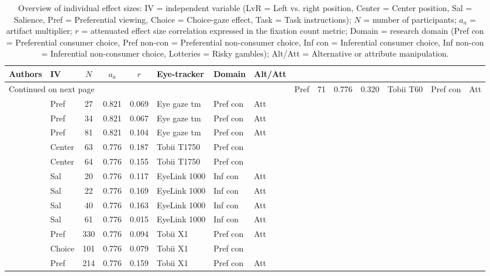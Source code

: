\begingroup\footnotesize
\begin{longtable}{p{5cm}lccclll}
\caption{Overview of individual effect sizes: IV = independent variable (LvR = Left vs. right position, Center = Center position, Sal = Salience, Pref = Preferential viewing, Choice = Choice-gaze effect, Task = Task instructions); $N$ = number of participants; $a_a$ = artifact multiplier; $r$ = attenuated effect size correlation expressed in the fixation count metric; Domain = research domain (Pref con = Preferential consumer choice, Pref non-con = Preferential non-consumer choice, Inf con = Inferential consumer choice, Inf non-con = Inferential non-consumer choice, Lotteries = Risky gambles); Alt/Att = Alternative or attribute manipulation.} \\ 
  \hline
Authors & IV & $N$ & $a_a$ & $r$ & Eye-tracker & Domain & Alt/Att \\ 
  \hline
\endhead
\hline
\multicolumn{8}{l}{\footnotesize Continued on next page}
\endfoot
\endlastfoot
 \hline
\cite{ares2014} & Pref & 71 & 0.776 & 0.320 & Tobii T60 & Pref con & Att \\ 
  \cite{ashby2015} & Pref & 27 & 0.821 & 0.069 & Eye gaze tm & Pref con & Att \\ 
  \cite{ashby2015} & Pref & 34 & 0.821 & 0.067 & Eye gaze tm & Pref con & Att \\ 
  \cite{ashby2015} & Pref & 81 & 0.821 & 0.104 & Eye gaze tm & Pref con & Att \\ 
  \cite{atalay2012a} & Center & 63 & 0.776 & 0.187 & Tobii T1750 & Pref con &  \\ 
  \cite{atalay2012a} & Center & 64 & 0.776 & 0.155 & Tobii T1750 & Pref con &  \\ 
  \cite{bagger2016} & Sal & 20 & 0.776 & 0.117 & EyeLink 1000 & Inf con & Att \\ 
  \cite{bagger2016} & Sal & 22 & 0.776 & 0.169 & EyeLink 1000 & Inf con & Att \\ 
  \cite{bagger2016} & Sal & 40 & 0.776 & 0.163 & EyeLink 1000 & Inf con & Att \\ 
  \cite{bagger2016} & Sal & 61 & 0.776 & 0.015 & EyeLink 1000 & Inf con & Att \\ 
  \cite{behe2014} & Pref & 330 & 0.776 & 0.094 & Tobii X1 & Pref con & Att \\ 
  \cite{behe2015} & Choice & 101 & 0.776 & 0.079 & Tobii X1 & Pref con &  \\ 
  \cite{behe2017} & Pref & 214 & 0.776 & 0.159 & Tobii X1 & Pref con & Att \\ 

\end{longtable}
